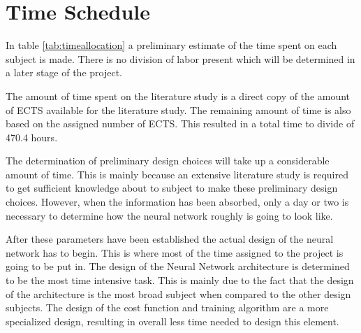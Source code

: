 \section{Time Schedule}
\label{TimeTable}

In table \ref{tab:timeallocation} a preliminary estimate of the time spent on each subject is made. There is no division of labor present which will be determined in a later stage of the project.

The amount of time spent on the literature study is a direct copy of the amount of ECTS available for the literature study. The remaining amount of time is also based on the assigned number of ECTS. This resulted in a total time to divide of 470.4 hours.

The determination of preliminary design choices will take up a considerable amount of time. This is mainly because an extensive literature study is required to get sufficient knowledge about to subject to make these preliminary design choices. However, when the information has been absorbed, only a day or two is necessary to determine how the neural network roughly is going to look like.

After these parameters have been established the actual design of the neural network has to begin. This is where most of the time assigned to the project is going to be put in. The design of the Neural Network architecture is determined to be the most time intensive task. 
This is mainly due to the fact that the design of the architecture is the most broad subject when compared to the other design subjects. The design of the cost function and training algorithm are a more specialized design, resulting in overall less time needed to design this element.


